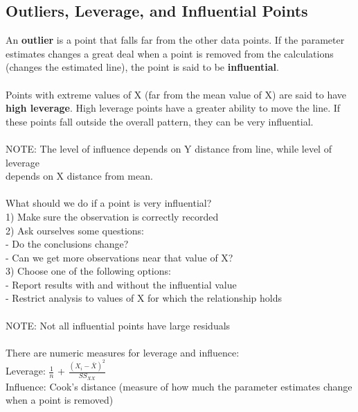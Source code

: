 \documentclass[12pt, a4paper]{article}
\begin{document}
	\subsection{Outliers, Leverage, and Influential Points}
	An \textbf{outlier} is a point that falls far from the other data points. If the parameter estimates changes a great deal when a point is removed from the calculations (changes the estimated line), the point is said to be \textbf{influential}. \\~\\
	Points with extreme values of X (far from the mean value of X) are said to have \textbf{high leverage}. High leverage points have a greater ability to move the line. If these points fall outside the overall pattern, they can be very influential. \\~\\
	NOTE: The level of influence depends on Y distance from line, while level of leverage \\ depends on X distance from mean. \\~\\
	What should we do if a point is very influential? \\
	1) Make sure the observation is correctly recorded \\
	2) Ask ourselves some questions: \\
	\hspace*{6mm} - Do the conclusions change? \\
	\hspace*{6mm} - Can we get more observations near that value of X? \\
	3) Choose one of the following options: \\
	\hspace*{6mm} - Report results with and without the influential value \\
	\hspace*{6mm} - Restrict analysis to values of X for which the relationship holds \\~\\
	NOTE: Not all influential points have large residuals \\~\\
	There are numeric measures for leverage and influence: \\
	Leverage: $\frac{1}{n}$ + $\frac{(X_i-\bar{X})^2}{SS_{XX}}$ \\
	Influence: Cook's distance (measure of how much the parameter estimates change when a point \hspace*{49mm} is removed)  \\
	
\end{document}
